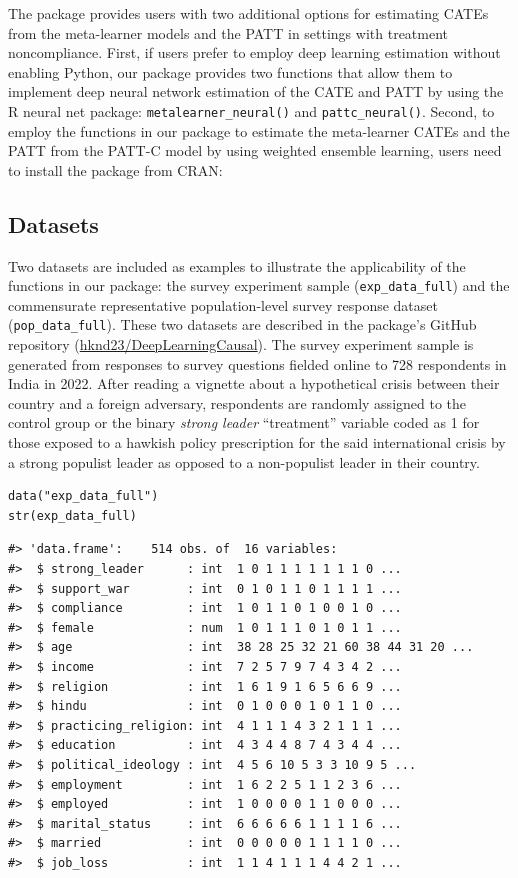 The  package provides users with two additional
options for estimating CATEs from the meta-learner models and the PATT
in settings with treatment noncompliance. First, if users prefer to
employ deep learning estimation without enabling Python, our package
provides two functions that allow them to implement deep neural network
estimation of the CATE and PATT by using the R neural net package:
\texttt{metalearner\_neural()} and \texttt{pattc\_neural()}. Second, to employ the
functions in our package to estimate the meta-learner CATEs and the PATT
from the PATT-C model by using weighted ensemble learning, users need to
install the  package from CRAN:

\subsection{Datasets}\label{datasets}

Two datasets are included as examples to illustrate the applicability
of the functions in our package: the survey experiment sample
(\texttt{exp\_data\_full}) and the commensurate representative population-level
survey response dataset (\texttt{pop\_data\_full}). These two datasets are described in
the package's GitHub repository
(\href{https://github.com/hknd23/DeepLearningCausal}{hknd23/DeepLearningCausal}).
The survey experiment sample is generated from responses to survey
questions fielded online to 728 respondents in India in 2022. After
reading a vignette about a hypothetical crisis between their country and
a foreign adversary, respondents are randomly assigned to the control
group or the binary \emph{strong leader} ``treatment'' variable coded as 1 for
those exposed to a hawkish policy prescription for the said
international crisis by a strong populist leader as opposed to a
non-populist leader in their country.

\begin{verbatim}
data("exp_data_full") 
str(exp_data_full) 
\end{verbatim}

\begin{verbatim}
#> 'data.frame':    514 obs. of  16 variables:
#>  $ strong_leader      : int  1 0 1 1 1 1 1 1 1 0 ...
#>  $ support_war        : int  0 1 0 1 1 0 1 1 1 1 ...
#>  $ compliance         : int  1 0 1 1 0 1 0 0 1 0 ...
#>  $ female             : num  1 0 1 1 1 0 1 0 1 1 ...
#>  $ age                : int  38 28 25 32 21 60 38 44 31 20 ...
#>  $ income             : int  7 2 5 7 9 7 4 3 4 2 ...
#>  $ religion           : int  1 6 1 9 1 6 5 6 6 9 ...
#>  $ hindu              : int  0 1 0 0 0 1 0 1 1 0 ...
#>  $ practicing_religion: int  4 1 1 1 4 3 2 1 1 1 ...
#>  $ education          : int  4 3 4 4 8 7 4 3 4 4 ...
#>  $ political_ideology : int  4 5 6 10 5 3 3 10 9 5 ...
#>  $ employment         : int  1 6 2 2 5 1 1 2 3 6 ...
#>  $ employed           : int  1 0 0 0 0 1 1 0 0 0 ...
#>  $ marital_status     : int  6 6 6 6 6 1 1 1 1 6 ...
#>  $ married            : int  0 0 0 0 0 1 1 1 1 0 ...
#>  $ job_loss           : int  1 1 4 1 1 1 4 4 2 1 ...
\end{verbatim}

